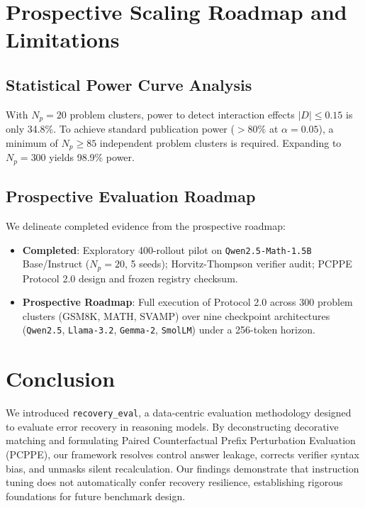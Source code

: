 \documentclass[conference]{IEEEtran}
\begin{document}
\section{Prospective Scaling Roadmap and Limitations}

\subsection{Statistical Power Curve Analysis}
With $N_p = 20$ problem clusters, power to detect interaction effects $|D| \le 0.15$ is only 34.8\%. To achieve standard publication power ($>80\%$ at $\alpha = 0.05$), a minimum of $N_p \ge 85$ independent problem clusters is required. Expanding to $N_p = 300$ yields 98.9\% power.

\subsection{Prospective Evaluation Roadmap}
We delineate completed evidence from the prospective roadmap:
\begin{itemize}
    \item \textbf{Completed}: Exploratory 400-rollout pilot on \texttt{Qwen2.5-Math-1.5B} Base/Instruct ($N_p=20$, 5 seeds); Horvitz-Thompson verifier audit; PCPPE Protocol 2.0 design and frozen registry checksum.
    \item \textbf{Prospective Roadmap}: Full execution of Protocol 2.0 across 300 problem clusters (GSM8K, MATH, SVAMP) over nine checkpoint architectures (\texttt{Qwen2.5}, \texttt{Llama-3.2}, \texttt{Gemma-2}, \texttt{SmolLM}) under a 256-token horizon.
\end{itemize}

\section{Conclusion}
We introduced \texttt{recovery\_eval}, a data-centric evaluation methodology designed to evaluate error recovery in reasoning models. By deconstructing decorative matching and formulating Paired Counterfactual Prefix Perturbation Evaluation (PCPPE), our framework resolves control answer leakage, corrects verifier syntax bias, and unmasks silent recalculation. Our findings demonstrate that instruction tuning does not automatically confer recovery resilience, establishing rigorous foundations for future benchmark design.



\end{document}
